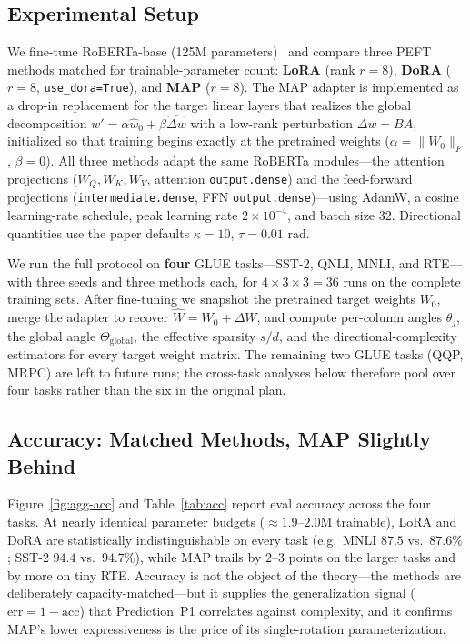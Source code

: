 \documentclass[11pt]{article}
\newcommand{\Thetaglob}{\Theta_{\mathrm{global}}}
\begin{document}
\subsection{Experimental Setup}
We fine-tune RoBERTa-base (125M parameters)~\cite{roberta} and compare three PEFT
methods matched for trainable-parameter count: \textbf{LoRA} (rank $r=8$),
\textbf{DoRA} ($r=8$, \texttt{use\_dora=True}), and \textbf{MAP} ($r=8$). The MAP
adapter is implemented as a drop-in replacement for the target linear layers that
realizes the global decomposition $w'=\alpha\hat w_0+\beta\widehat{\Delta w}$ with a
low-rank perturbation $\Delta w=BA$, initialized so that training begins exactly at
the pretrained weights ($\alpha=\|W_0\|_F$, $\beta=0$). All three methods adapt the
same RoBERTa modules---the attention projections ($W_Q,W_K,W_V$, attention
\texttt{output.dense}) and the feed-forward projections
(\texttt{intermediate.dense}, FFN \texttt{output.dense})---using AdamW, a cosine
learning-rate schedule, peak learning rate $2\times10^{-4}$, and batch size 32.
Directional quantities use the paper defaults $\kappa=10$, $\tau=0.01$ rad.

We run the full protocol on \textbf{four} GLUE tasks---SST-2, QNLI, MNLI, and
RTE---with three seeds and three methods each, for $4\times3\times3=36$ runs on the
complete training sets. After fine-tuning we snapshot the pretrained target weights
$W_0$, merge the adapter to recover $\hat W=W_0+\Delta W$, and compute per-column
angles $\theta_j$, the global angle $\Thetaglob$, the effective sparsity $s/d$, and
the directional-complexity estimators for every target weight matrix. The remaining
two GLUE tasks (QQP, MRPC) are left to future runs; the cross-task analyses below
therefore pool over four tasks rather than the six in the original plan.

\subsection{Accuracy: Matched Methods, MAP Slightly Behind}
Figure~\ref{fig:agg-acc} and Table~\ref{tab:acc} report eval accuracy across the four
tasks. At nearly identical parameter budgets ($\approx1.9$--$2.0$M trainable), LoRA
and DoRA are statistically indistinguishable on every task (e.g.\ MNLI $87.5$ vs.\
$87.6\%$; SST-2 $94.4$ vs.\ $94.7\%$), while MAP trails by $2$--$3$ points on the
larger tasks and by more on tiny RTE. Accuracy is not the object of the theory---the
methods are deliberately capacity-matched---but it supplies the generalization signal
($\text{err}=1-\text{acc}$) that Prediction~P1 correlates against complexity, and it
confirms MAP's lower expressiveness is the price of its single-rotation
parameterization.
\end{document}
